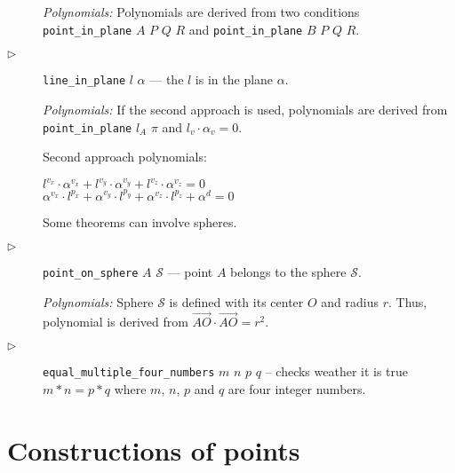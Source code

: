 \documentclass{article}
\begin{document}
\begin{description}
  {\em Polynomials:} Polynomials are derived from two conditions {\tt
    point\_in\_plane} $A$ $P$ $Q$ $R$ and {\tt point\_in\_plane} $B$
  $P$ $Q$ $R$.

\item[$\triangleright$] {\tt line\_in\_plane} $l$ $\alpha$ --- the $l$
  is in the plane $\alpha$.

  {\em Polynomials:} If the second approach is used, polynomials are
  derived from {\tt point\_in\_plane} $l_A$ $\pi$ and
  $l_v \cdot \alpha_v = 0$.

Second approach polynomials:
\begin{tabbing}
$l^{v_x}\cdot \alpha^{v_x} + l^{v_y}\cdot \alpha^{v_y} + l^{v_z}\cdot \alpha^{v_z} = 0$ \\
$\alpha^{v_x}\cdot l^{p_x} + \alpha^{v_y}\cdot l^{p_y} + \alpha^{v_z}\cdot l^{p_z} + \alpha^{d} = 0$
\end{tabbing}

\bigskip
Some theorems can involve spheres. 

\item[$\triangleright$] {\tt point\_on\_sphere} $A$ $\mathcal{S}$
  --- point $A$ belongs to the sphere $\mathcal{S}$.

{\em Polynomials:} Sphere $\mathcal{S}$ is defined with its center $O$
and radius $r$. Thus, polynomial is derived from
$\overrightarrow{AO}\cdot\overrightarrow{AO} = r^2$.

\item[$\triangleright$] {\tt equal\_multiple\_four\_numbers} $m$ $n$
  $p$ $q$ -- checks weather it is true $m*n = p*q$ where $m$, $n$, $p$
  and $q$ are four integer numbers.

\end{description}

\section{Constructions of points}
\end{document}
